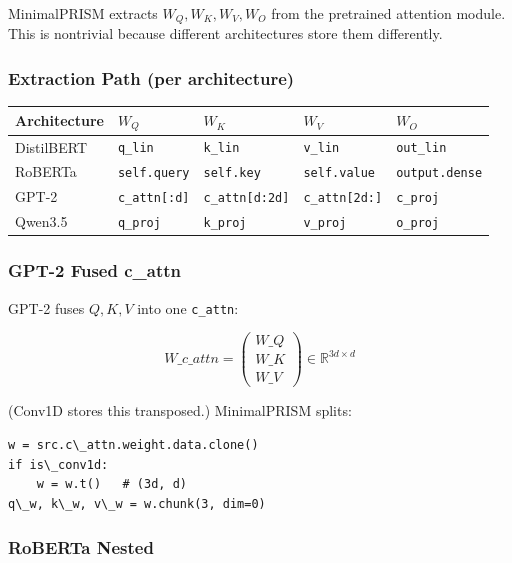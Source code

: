 MinimalPRISM extracts $W_Q, W_K, W_V, W_O$ from the pretrained attention 
module. This is nontrivial because different architectures store them 
differently.

\subsubsection{Extraction Path (per architecture)}

\begin{table}[H]
\centering
\small
\begin{tabular}{lllll}
\toprule
\textbf{Architecture} & \textbf{$W_Q$} & \textbf{$W_K$} & \textbf{$W_V$} & \textbf{$W_O$} \\
\midrule
DistilBERT & \texttt{q\_lin} & \texttt{k\_lin} & \texttt{v\_lin} & \texttt{out\_lin} \\
RoBERTa & \texttt{self.query} & \texttt{self.key} & \texttt{self.value} & \texttt{output.dense} \\
GPT-2 & \texttt{c\_attn[:d]} & \texttt{c\_attn[d:2d]} & \texttt{c\_attn[2d:]} & \texttt{c\_proj} \\
Qwen3.5 & \texttt{q\_proj} & \texttt{k\_proj} & \texttt{v\_proj} & \texttt{o\_proj} \\
\bottomrule
\end{tabular}
\end{table}

\subsubsection{GPT-2 Fused c\_attn}

GPT-2 fuses $Q, K, V$ into one \texttt{c\_attn}:

\[
W\_{c\_attn} = \begin{pmatrix} W\_Q \\ W\_K \\ W\_V \end{pmatrix} \in \mathbb{R}^{3d \times d}
\tag{4.7}
\]

(Conv1D stores this transposed.) MinimalPRISM splits:

\begin{lstlisting}
w = src.c\_attn.weight.data.clone()
if is\_conv1d:
    w = w.t()   # (3d, d)
q\_w, k\_w, v\_w = w.chunk(3, dim=0)
\end{lstlisting}

\subsubsection{RoBERTa Nested}

